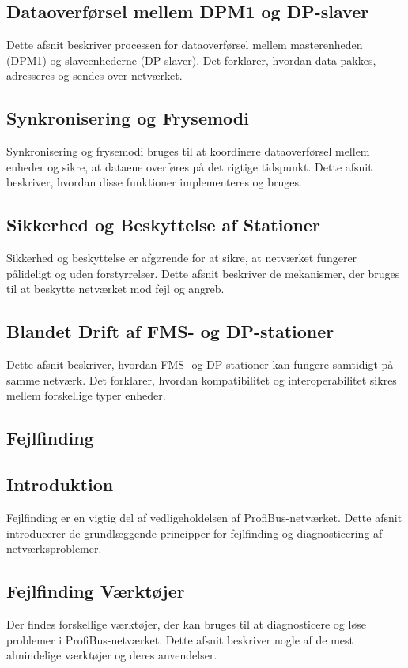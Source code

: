 \subsection*{Dataoverførsel mellem DPM1 og DP-slaver}
Dette afsnit beskriver processen for dataoverførsel mellem masterenheden (DPM1) og slaveenhederne (DP-slaver). Det forklarer, hvordan data pakkes, adresseres og sendes over netværket.

\subsection*{Synkronisering og Frysemodi}
Synkronisering og frysemodi bruges til at koordinere dataoverførsel mellem enheder og sikre, at dataene overføres på det rigtige tidspunkt. Dette afsnit beskriver, hvordan disse funktioner implementeres og bruges.

\subsection*{Sikkerhed og Beskyttelse af Stationer}
Sikkerhed og beskyttelse er afgørende for at sikre, at netværket fungerer pålideligt og uden forstyrrelser. Dette afsnit beskriver de mekanismer, der bruges til at beskytte netværket mod fejl og angreb.

\subsection*{Blandet Drift af FMS- og DP-stationer}
Dette afsnit beskriver, hvordan FMS- og DP-stationer kan fungere samtidigt på samme netværk. Det forklarer, hvordan kompatibilitet og interoperabilitet sikres mellem forskellige typer enheder.

\subsection{Fejlfinding}
\subsection*{Introduktion}
Fejlfinding er en vigtig del af vedligeholdelsen af ProfiBus-netværket. Dette afsnit introducerer de grundlæggende principper for fejlfinding og diagnosticering af netværksproblemer.

\subsection*{Fejlfinding Værktøjer}
Der findes forskellige værktøjer, der kan bruges til at diagnosticere og løse problemer i ProfiBus-netværket. Dette afsnit beskriver nogle af de mest almindelige værktøjer og deres anvendelser.

